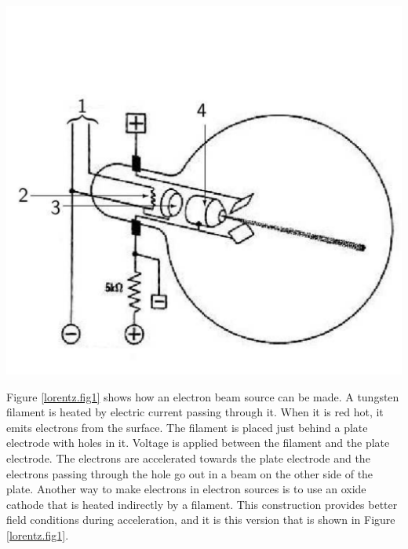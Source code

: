 \documentclass[../Elmag-labhefte-2020.tex]{subfiles}
\begin{document}
\begin{marginfigure}%
    \vspace{-2cm}
    \centering
    \includegraphics[width=\textwidth]{fig/LorentzFig1_resized.pdf}
    \caption{%
        Sketch of a electron beam source.
        \textbf{(1)} AC source (5-\SI{10}{\volt}).
        \textbf{(2)} Incandescent filament heats up the
        \textbf{(3)} oxide layer.
        The acceleration voltage between the filament and
        \textbf{(4)} anode accelerated the electrons.
    }
    \label{lorentz.fig1}
\end{marginfigure}
Figure \ref{lorentz.fig1} shows how an electron beam source can be made. A tungsten filament is heated by electric current passing through it. When it is red hot, it emits electrons from the surface. The filament is placed just behind a plate electrode with holes in it. Voltage is applied between the filament and the plate electrode. The electrons are accelerated towards the plate electrode and the electrons passing through the hole go out in a beam on the other side of the plate. Another way to make electrons in electron sources is to use an oxide cathode that is heated indirectly by a filament. This construction provides better field conditions during acceleration, and it is this version that is shown in Figure \ref{lorentz.fig1}.
%
\end{document}
